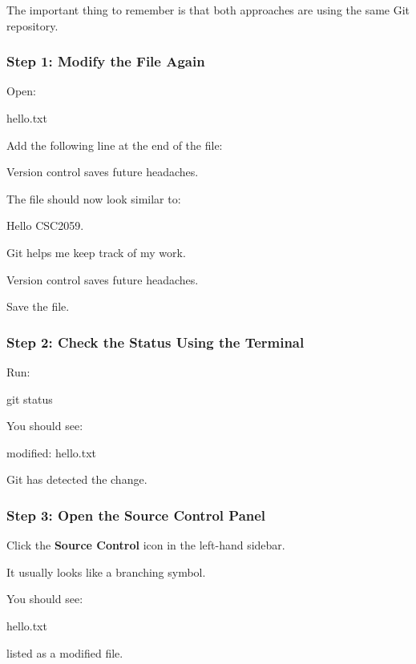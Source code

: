 \documentclass{csc2059practical}
\begin{document}
The important thing to remember is that both approaches are using the same Git repository.

\subsubsection{Step 1: Modify the File Again}
Open:

\begin{terminalplain}
hello.txt
\end{terminalplain}
Add the following line at the end of the file:

\begin{terminalplain}
Version control saves future headaches.
\end{terminalplain}
The file should now look similar to:

\begin{terminalplain}
Hello CSC2059.
\end{terminalplain}
Git helps me keep track of my work.

\begin{terminalplain}
Version control saves future headaches.
\end{terminalplain}
Save the file.

\subsubsection{Step 2: Check the Status Using the Terminal}
Run:

\begin{terminalplain}
git status
\end{terminalplain}
You should see:

\begin{terminalplain}
modified: hello.txt
\end{terminalplain}
Git has detected the change.

\subsubsection{Step 3: Open the Source Control Panel}
Click the \textbf{Source Control} icon in the left-hand sidebar.

It usually looks like a branching symbol.

You should see:

\begin{terminalplain}
hello.txt
\end{terminalplain}
listed as a modified file.
\end{document}
